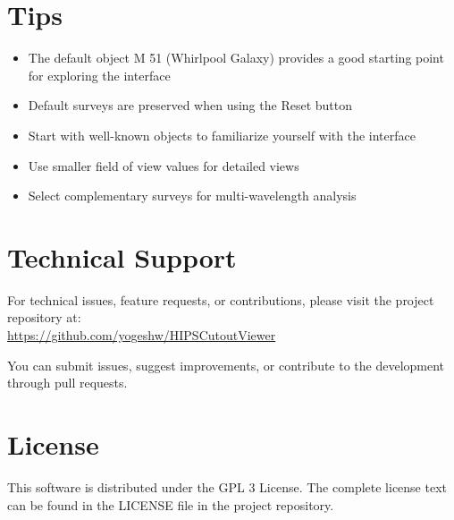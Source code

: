\documentclass{article}
\begin{document}
\section{Tips}
\begin{itemize}
    \item The default object M 51 (Whirlpool Galaxy) provides a good starting point for exploring the interface
    \item Default surveys are preserved when using the Reset button
    \item Start with well-known objects to familiarize yourself with the interface
    \item Use smaller field of view values for detailed views
    \item Select complementary surveys for multi-wavelength analysis
\end{itemize}

\section{Technical Support}
For technical issues, feature requests, or contributions, please visit the project repository at:\\
\url{https://github.com/yogeshw/HIPSCutoutViewer}

You can submit issues, suggest improvements, or contribute to the development through pull requests.

\section{License}
This software is distributed under the GPL 3 License. The complete license text can be found in the LICENSE file in the project repository.
\end{document}
